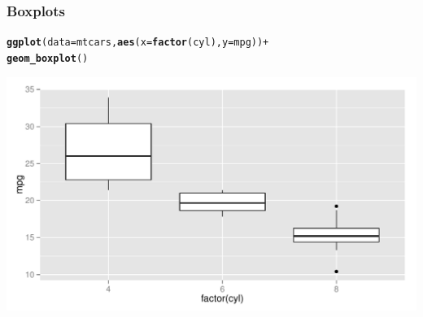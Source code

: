 \documentclass[12pt]{beamer}\usepackage[]{graphicx}\usepackage[]{color}
\makeatletter
\newcommand{\hlopt}[1]{\textcolor[rgb]{0,0,0}{#1}}%
\newcommand{\hlstd}[1]{\textcolor[rgb]{0.345,0.345,0.345}{#1}}%
\newcommand{\hlkwc}[1]{\textcolor[rgb]{0.333,0.667,0.333}{#1}}%
\newcommand{\hlkwd}[1]{\textcolor[rgb]{0.737,0.353,0.396}{\textbf{#1}}}%
\newenvironment{kframe}{%
 \def\at@end@of@kframe{}%
 \ifinner\ifhmode%
  \def\at@end@of@kframe{\end{minipage}}%
  \begin{minipage}{\columnwidth}%
 \fi\fi%
 \def\FrameCommand##1{\hskip\@totalleftmargin \hskip-\fboxsep
 \colorbox{shadecolor}{##1}\hskip-\fboxsep
     \hskip-\linewidth \hskip-\@totalleftmargin \hskip\columnwidth}%
 \MakeFramed {\advance\hsize-\width
   \@totalleftmargin\z@ \linewidth\hsize
   \@setminipage}}%
 {\par\unskip\endMakeFramed%
 \at@end@of@kframe}
\newenvironment{knitrout}{}{} %
\makeatother
\begin{document}
\begin{frame}[fragile]
\frametitle{Boxplots}

\begin{knitrout}\scriptsize
{}\color{fgcolor}\begin{kframe}
\begin{alltt}
\hlkwd{ggplot}\hlstd{(}\hlkwc{data} \hlstd{= mtcars,} \hlkwd{aes}\hlstd{(}\hlkwc{x} \hlstd{=} \hlkwd{factor}\hlstd{(cyl),} \hlkwc{y} \hlstd{= mpg))} \hlopt{+}
  \hlkwd{geom_boxplot}\hlstd{()}
\end{alltt}
\end{kframe}

{\centering \includegraphics[width=.9\linewidth,height=.5\linewidth]{figure/unnamed-chunk-7-1} 

}



\end{knitrout}

\end{frame}

\end{document}
